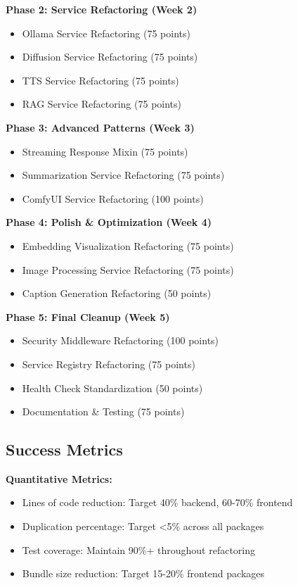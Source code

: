 \documentclass[10pt]{article}
\begin{document}
\textbf{Phase 2: Service Refactoring (Week 2)}
\begin{itemize}
    \item Ollama Service Refactoring (75 points)
    \item Diffusion Service Refactoring (75 points)
    \item TTS Service Refactoring (75 points)
    \item RAG Service Refactoring (75 points)
\end{itemize}

\textbf{Phase 3: Advanced Patterns (Week 3)}
\begin{itemize}
    \item Streaming Response Mixin (75 points)
    \item Summarization Service Refactoring (75 points)
    \item ComfyUI Service Refactoring (100 points)
\end{itemize}

\textbf{Phase 4: Polish \& Optimization (Week 4)}
\begin{itemize}
    \item Embedding Visualization Refactoring (75 points)
    \item Image Processing Service Refactoring (75 points)
    \item Caption Generation Refactoring (50 points)
\end{itemize}

\textbf{Phase 5: Final Cleanup (Week 5)}
\begin{itemize}
    \item Security Middleware Refactoring (100 points)
    \item Service Registry Refactoring (75 points)
    \item Health Check Standardization (50 points)
    \item Documentation \& Testing (75 points)
\end{itemize}

\subsection{Success Metrics}

\textbf{Quantitative Metrics:}
\begin{itemize}
    \item Lines of code reduction: Target 40\% backend, 60-70\% frontend
    \item Duplication percentage: Target <5\% across all packages
    \item Test coverage: Maintain 90\%+ throughout refactoring
    \item Bundle size reduction: Target 15-20\% frontend packages
\end{itemize}
\end{document}

